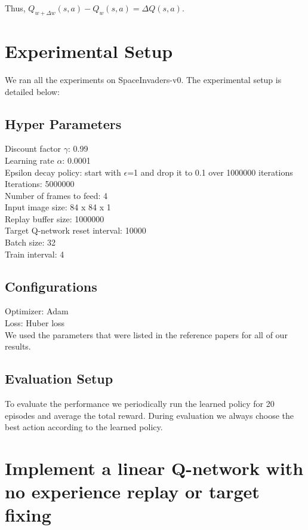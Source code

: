 \documentclass{article}
\begin{document}
Thus, $Q_{w+\Delta w}(s,a) - Q_{w}(s,a) = \Delta Q(s,a)$. 

\section*{Experimental Setup}
We ran all the experiments on SpaceInvaders-v0. The experimental setup is detailed below:

\subsection*{Hyper Parameters}
Discount factor $\gamma$: 0.99\\
Learning rate $\alpha$: 0.0001\\
Epsilon decay policy: start with $\epsilon$=1 and drop it to 0.1 over 1000000 iterations\\
Iterations: 5000000\\
Number of frames to feed: 4\\
Input image size: 84 x 84 x 1\\
Replay buffer size: 1000000\\
Target Q-network reset interval: 10000\\
Batch size: 32\\
Train interval: 4

\subsection*{Configurations}
Optimizer: Adam\\
Loss: Huber loss\\

We used the parameters that were listed in the reference papers for all of our results.

\subsection*{Evaluation Setup}
To evaluate the performance we periodically run the learned policy for 20 episodes and average the total reward. During evaluation we always choose the best action according to the learned policy.





\section*{Implement a linear Q-network with no experience replay or target fixing}
\end{document}
